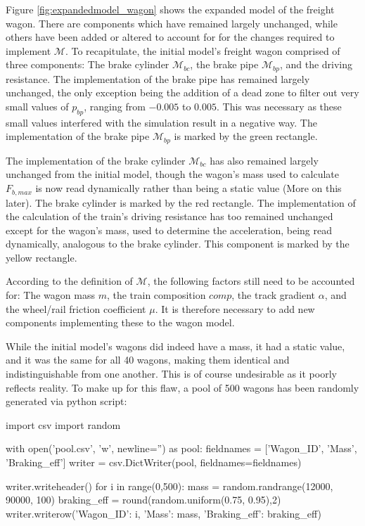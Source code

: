 \par\noindent
Figure \ref{fig:expandedmodel_wagon} shows the expanded model of the freight wagon. There are components which have remained largely unchanged, while others have been added or altered to account for for the changes required to implement ${\mathcal{M}}$. To recapitulate, the initial model's freight wagon comprised of three components: The brake cylinder ${\mathcal{M}}_{bc}$, the brake pipe ${\mathcal{M}}_{bp}$, and the driving resistance. The implementation of the brake pipe has remained largely unchanged, the only exception being the addition of a dead zone to filter out very small values of $p_{bp}$, ranging from $-0.005$ to $0.005$. This was necessary as these small values interfered with the simulation result in a negative way. The implementation of the brake pipe ${\mathcal{M}}_{bp}$ is marked by the green rectangle.
\par
The implementation of the brake cylinder ${\mathcal{M}}_{bc}$ has also remained largely unchanged from the initial model, though the wagon's mass used to calculate $F_{b,max}$ is now read dynamically rather than being a static value (More on this later). The brake cylinder is marked by the red rectangle. The implementation of the calculation of the train's driving resistance has too remained unchanged except for the wagon's mass, used to determine the acceleration, being read dynamically, analogous to the brake cylinder. This component is marked by the yellow rectangle.
\bigskip
\par\noindent
According to the definition of ${\mathcal{M}}$, the following factors still need to be accounted for: The wagon mass $m$, the train composition $comp$, the track gradient $\alpha$, and the wheel/rail friction coefficient $\mu$. It is therefore necessary to add new components implementing these to the wagon model.
\par
While the initial model's wagons did indeed have a mass, it had a static value, and it was the same for all 40 wagons, making them identical and indistinguishable from one another. This is of course undesirable as it poorly reflects reality. To make up for this flaw, a pool of 500 wagons has been randomly generated via python script:

\bigskip
\begin{python}
import csv
import random

with open('pool.csv', 'w', newline='') as pool:
	fieldnames = ['Wagon_ID', 'Mass', 'Braking_eff']
	writer = csv.DictWriter(pool, fieldnames=fieldnames)
	
	writer.writeheader()
	for i in range(0,500): 
		mass = random.randrange(12000, 90000, 100)
		braking_eff = round(random.uniform(0.75, 0.95),2)
		writer.writerow({'Wagon_ID': i, 'Mass': mass, 'Braking_eff': braking_eff})
\end{python}
\bigskip

